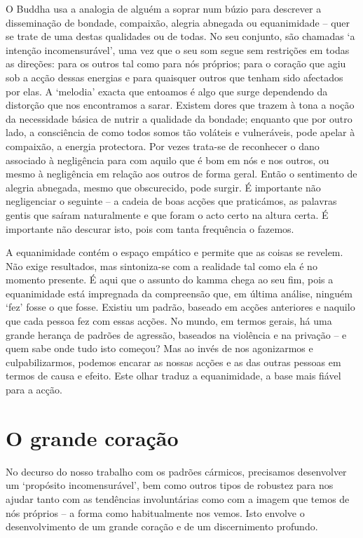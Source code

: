 O Buddha usa a analogia de alguém a soprar num búzio para descrever a
disseminação de bondade, compaixão, alegria abnegada ou equanimidade -- quer se
trate de uma destas qualidades ou de todas. No seu conjunto,
são chamadas `a intenção incomensurável', uma vez que o seu som segue sem
restrições em todas as direções: para os outros tal como para nós próprios; para
o coração que agiu sob a acção dessas energias e para quaisquer outros que
tenham sido afectados por elas. A `melodia' exacta que entoamos é algo que surge
dependendo da distorção que nos encontramos a sarar. Existem dores que trazem à
tona a noção da necessidade básica de nutrir a qualidade da bondade; enquanto
que por outro lado, a consciência de como todos somos tão voláteis e
vulneráveis, pode apelar à compaixão, a energia protectora. Por vezes trata-se
de reconhecer o dano associado à negligência para com aquilo que é bom em nós e
nos outros, ou mesmo à negligência em relação aos outros de forma geral. Então o
sentimento de alegria abnegada, mesmo que obscurecido, pode surgir. É importante
não negligenciar o seguinte -- a cadeia de boas acções que praticámos, as
palavras gentis que saíram naturalmente e que foram o acto certo na altura
certa. É importante não descurar isto, pois com tanta frequência o fazemos.

A equanimidade contém o espaço empático e permite que as coisas se revelem. Não
exige resultados, mas sintoniza-se com a realidade tal como ela é no momento
presente. É aqui que o assunto do kamma chega ao seu fim, pois a equanimidade
está impregnada da compreensão que, em última análise, ninguém `fez' fosse o que
fosse. Existiu um padrão, baseado em acções anteriores e naquilo que cada pessoa
fez com essas acções. No mundo, em termos gerais, há uma grande herança de
padrões de agressão, baseados na violência e na privação -- e quem sabe onde
tudo isto começou? Mas ao invés de nos agonizarmos e culpabilizarmos, podemos
encarar as nossas acções e as das outras pessoas em termos de causa e efeito.
Este olhar traduz a equanimidade, a base mais fiável para a acção.

\section{O grande coração}

No decurso do nosso trabalho com os padrões cármicos, precisamos desenvolver um
`propósito incomensurável', bem como outros tipos de robustez para nos ajudar
tanto com as tendências involuntárias como com a imagem que temos de nós
próprios -- a forma como habitualmente nos vemos. Isto envolve o desenvolvimento
de um grande coração e de um discernimento profundo.

